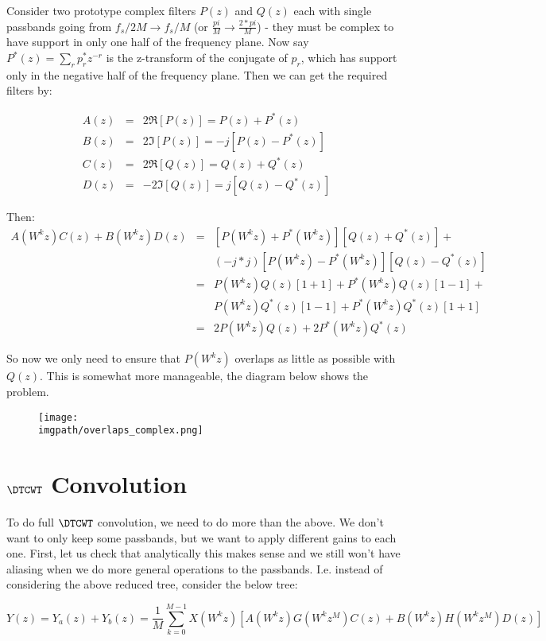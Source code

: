 Consider two prototype complex filters $P(z)$ and $Q(z)$ each with single
passbands going from $f_s/2M \rightarrow f_s/M$ (or $\frac{pi}{M} \rightarrow
\frac{2*pi}{M}$) - they must be complex to have support in only one half of the
frequency plane. Now say $P^*(z) = \sum_{r}p_r^*z^{-r}$ is the z-transform of
the conjugate of $p_r$, which has support only in the negative half of the
frequency plane. Then we can get the required filters by:

\begin{eqnarray}
A(z) &=& 2\Re [P(z)] = P(z) + P^*(z) \\
B(z) &=& 2\Im [P(z)] = -j[P(z) - P^*(z)] \\
C(z) &=& 2\Re [Q(z)] = Q(z) + Q^*(z) \\
D(z) &=& -2\Im [Q(z)] = j[Q(z) - Q^*(z)]
\end{eqnarray}

Then:
\begin{eqnarray}
A(W^kz)C(z) + B(W^kz)D(z) &=&  [P(W^kz) + P^*(W^kz)][Q(z) + Q^*(z)] + \nonumber \\
  && (-j*j)[P(W^kz) - P^*(W^kz)][Q(z) - Q^*(z)] \\
&=& P(W^kz)Q(z)[1+1] + P^*(W^kz)Q(z)[1-1] + \nonumber \\ 
  && P(W^kz)Q^*(z)[1-1] + P^*(W^kz)Q^*(z)[1+1] \\
&=& 2P(W^kz)Q(z) + 2P^*(W^kz)Q^*(z)
\end{eqnarray}

So now we only need to ensure that $P(W^kz)$ overlaps as little as possible with
$Q(z)$. This is somewhat more manageable, the diagram below shows the problem.

\begin{figure}
  \texttt{[image: \\imgpath/overlaps\_complex.png]}
\end{figure}


\section{$\DTCWT$ Convolution}
To do full $\DTCWT$ convolution, we need to do more than the above. We don't
want to only keep some passbands, but we want to apply different gains to each
one. First, let us check that analytically this makes sense and we still won't
have aliasing when we do more general operations to the passbands. I.e. instead
of considering the above reduced tree, consider the below tree:

$$Y(z) = Y_{a}(z) + Y_{b}(z) = \frac{1}{M} \sum_{k=0}^{M-1} X(W^k z) [A(W^kz)G(W^kz^{M})C(z) + B(W^kz)H(W^kz^{M})D(z)]$$


